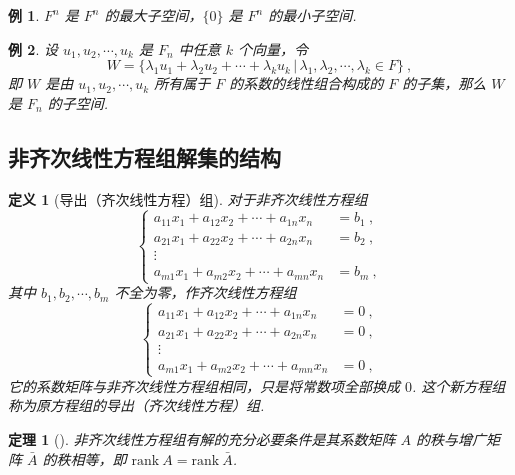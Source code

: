 \documentclass[zihao=-4,UTF8,linespread=1.8,nothm]{aytony_base}
\newtheorem{theorem}{\indent 定理}[subsection]
\newtheorem{definition}{\indent 定义}[subsection]
\newtheorem{example}{\indent 例}[subsection]
\begin{document}
\begin{example}
    $F^n$ 是 $F^n$ 的最大子空间，$\{0\}$ 是 $F^n$ 的最小子空间.
\end{example}

\begin{example}
    设 $u_1, u_2, \cdots, u_k$ 是 $F_n$ 中任意 $k$ 个向量，令 $$
        W = \{\lambda_1u_1 + \lambda_2u_2 + \cdots + \lambda_ku_k\,|\,\lambda_1, \lambda_2, \cdots, \lambda_k \in F\}\ ,
    $$ 即 $W$ 是由 $u_1, u_2, \cdots, u_k$ 所有属于 $F$ 的系数的线性组合构成的 $F$ 的子集，那么 $W$ 是 $F_n$ 的子空间.
\end{example}

\subsection{非齐次线性方程组解集的结构}

\begin{definition}[导出（齐次线性方程）组]
    对于非齐次线性方程组 $$
        \left\{
        \begin{aligned}
            a_{11}x_1 + a_{12}x_2 + \cdots + a_{1n}x_n & = b_1\ , \\
            a_{21}x_1 + a_{22}x_2 + \cdots + a_{2n}x_n & = b_2\ , \\
            \vdots                                                \\
            a_{m1}x_1 + a_{m2}x_2 + \cdots + a_{mn}x_n & = b_m\ ,
        \end{aligned}
        \right.
    $$ 其中 $b_1, b_2, \cdots, b_m$ 不全为零，作齐次线性方程组 $$
        \left\{
        \begin{aligned}
            a_{11}x_1 + a_{12}x_2 + \cdots + a_{1n}x_n & = 0\ , \\
            a_{21}x_1 + a_{22}x_2 + \cdots + a_{2n}x_n & = 0\ , \\
            \vdots                                              \\
            a_{m1}x_1 + a_{m2}x_2 + \cdots + a_{mn}x_n & = 0\ ,
        \end{aligned}
        \right.
    $$ 它的系数矩阵与非齐次线性方程组相同，只是将常数项全部换成 $0$. 这个新方程组称为原方程组的导出（齐次线性方程）组.
\end{definition}

\begin{theorem}[]
    非齐次线性方程组有解的充分必要条件是其系数矩阵 $A$ 的秩与增广矩阵 $\bar{A}$ 的秩相等，即 $\mathrm{rank}\ A = \mathrm{rank}\ \bar{A}$.
\end{theorem}
\end{document}
